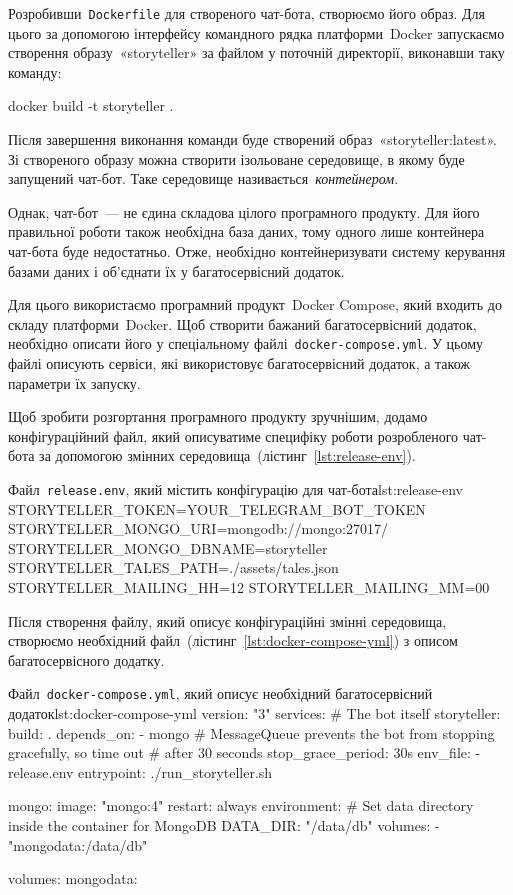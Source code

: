 \documentclass[
	a4paper,
	oneside,
	BCOR = 10mm,
	DIV = 12,
	12pt,
	headings = normal,
]{scrartcl}
\newcommand{\filename}[1]{\texttt{#1}}
\begin{document}
			Розробивши~\filename{\textenglish{Dockerfile}} для створеного чат-бота, створюємо його образ. Для цього за допомогою інтерфейсу командного рядка платформи~\textenglish{Docker} запускаємо створення образу~«\textenglish{storyteller}» за файлом у поточній директорії, виконавши таку команду:
			\begin{bashterm}
				docker build -t storyteller .
			\end{bashterm}
			Після завершення виконання команди буде створений образ~«\textenglish{storyteller:latest}». Зі створеного образу можна створити ізольоване середовище, в якому буде запущений чат-бот. Таке середовище називається~\emph{контейнером}.

			Однак, чат-бот~— не єдина складова цілого програмного продукту. Для його правильної роботи також необхідна база даних, тому одного лише контейнера чат-бота буде недостатньо. Отже, необхідно контейнеризувати систему керування базами даних і об'єднати їх у багатосервісний додаток.

			Для цього використаємо програмний продукт~\textenglish{Docker Compose}, який входить до складу платформи~\textenglish{Docker}. Щоб створити бажаний багатосервісний додаток, необхідно описати його у спеціальному файлі~\filename{\textenglish{docker-compose.yml}}. У цьому файлі описують сервіси, які використовує багатосервісний додаток, а також параметри їх запуску.

			Щоб зробити розгортання програмного продукту зручнішим, додамо конфігураційний файл, який описуватиме специфіку роботи розробленого чат-бота за допомогою змінних середовища~(лістинг~\ref{lst:release-env}).

			\begin{listingplaintext}{Файл~\filename{\textenglish{release.env}}, який містить конфігурацію для чат-бота}{lst:release-env}
STORYTELLER_TOKEN=YOUR_TELEGRAM_BOT_TOKEN
STORYTELLER_MONGO_URI=mongodb://mongo:27017/
STORYTELLER_MONGO_DBNAME=storyteller
STORYTELLER_TALES_PATH=./assets/tales.json
STORYTELLER_MAILING_HH=12
STORYTELLER_MAILING_MM=00
			\end{listingplaintext}
			
			Після створення файлу, який описує конфігураційні змінні середовища, створюємо необхідний файл~(лістинг~\ref{lst:docker-compose-yml}) з описом багатосервісного додатку.

			\begin{listingdockercompose}{Файл~\filename{\textenglish{docker-compose.yml}}, який описує необхідний багатосервісний додаток}{lst:docker-compose-yml}
version: "3"
services:
  # The bot itself
  storyteller:
    build: .
    depends_on:
      - mongo
    # MessageQueue prevents the bot from stopping gracefully, so time out
    # after 30 seconds
    stop_grace_period: 30s
    env_file:
      - release.env
    entrypoint: ./run_storyteller.sh

  mongo:
    image: "mongo:4"
    restart: always
    environment:
      # Set data directory inside the container for MongoDB
      DATA_DIR: "/data/db"
    volumes:
      - "mongodata:/data/db"

volumes:
  mongodata:
			\end{listingdockercompose}
\end{document}
